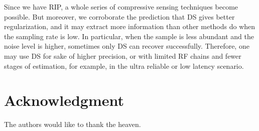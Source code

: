\documentclass[journal]{IEEEtran}
\begin{document}
Since we have RIP, a whole series of compressive sensing techniques become possible.
But moreover, we corroborate the prediction that DS gives better regularization, and it may extract more information than other methods do when the sampling rate is low.
In particular, when the sample is less abundant and the noise level is higher, sometimes only DS can recover successfully.
Therefore, one may use DS for sake of higher precision, or with limited RF chains and fewer stages of estimation, for example, in the ultra reliable or low latency scenario.

\section*{Acknowledgment}

The authors would like to thank the heaven.

\end{document}
